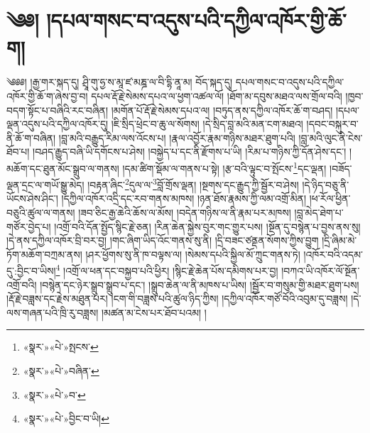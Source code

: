 \chapter{༄༅། །དཔལ་གསང་བ་འདུས་པའི་དཀྱིལ་འཁོར་གྱི་ཆོ་ག།}༄༅༅། །རྒྱ་གར་སྐད་དུ། ཤྲཱི་གུ་ཧྱ་ས་མཱ་ཛ་མཎྜ་ལ་བི་དྷི་ནཱ་མ། བོད་སྐད་དུ། དཔལ་གསང་བ་འདུས་པའི་དཀྱིལ་འཁོར་གྱི་ཆོ་ག་ཞེས་བྱ་བ། དཔལ་རྡོ་རྗེ་སེམས་དཔའ་ལ་ཕྱག་འཚལ་ལོ། །ཐོག་མ་དབུས་མཐའ་ལས་གྲོལ་བའི། །ཁྱབ་བདག་སྟོང་པ་བཞིའི་རང་བཞིན། །མགོན་པོ་རྡོ་རྗེ་སེམས་དཔའ་ལ། །བཏུད་ནས་དཀྱིལ་འཁོར་ཆོ་ག་བཤད། །དཔལ་ལྡན་འདུས་པའི་དཀྱིལ་འཁོར་དུ། །ཇི་སྲིད་ཕྲེང་བ་ཆུ་ལ་སོགས། །དེ་སྲིད་བླ་མའི་མན་ངག་མཐའ། །དབང་བསྐུར་བ་ནི་ཆོ་ག་བཞིན། །བླ་མའི་བརྒྱུད་རིམ་ལས་འོངས་པ། །རྣལ་འབྱོར་རྣམ་གཉིས་མཐར་ཐུག་པའི། །བླ་མའི་ལུང་ནི་ངེས་ཐོབ་པ། །བཤད་རྒྱུད་བཞི་ཡི་དགོངས་པ་ཤེས། །བསྐྱེད་པ་དང་ནི་རྫོགས་པ་ཡི། །རིམ་པ་གཉིས་ཀྱི་དོན་ཤེས་དང་། །མཆོག་དང་ཐུན་མོང་སྒྲུབ་ལ་གནས། །དམ་ཚིག་སྡོམ་ལ་གནས་པ་སྟེ། །རྩ་བའི་ལྟུང་བ་སྤོངས་\footnote{«སྣར་»«པེ་»སྤངས་}དང་ལྡན། །བཟོད་ལྡན་དྲང་ལ་གཡོ་སྒྱུ་མེད། །བརྟན་ཞིང་\footnote{«སྣར་»«པེ་»བཞིན་}དུལ་ལ་\footnote{«སྣར་»«པེ་»བ་}བློ་གྲོས་ལྡན། །སྔགས་དང་རྒྱུད་ཀྱི་སྦྱོར་བ་ཤེས། །དེ་ཉིད་བཅུ་ནི་ཡོངས་ཤེས་ཤིང་། །དཀྱིལ་འཁོར་འདྲི་དང་རབ་གནས་མཁས། །ཉན་ཐོས་རྣམས་ཀྱི་ལམ་འགྲོ་མིན། །ཕ་རོལ་ཕྱིན་བཅུའི་ཚུལ་ལ་གནས། །ཟབ་ཅིང་རྒྱ་ཆེའི་ཆོས་ལ་མོས། །བདེན་གཉིས་ལ་ནི་རྣམ་པར་མཁས། །བླ་མེད་ཐེག་པ་གཙོར་བྱེད་པ། །འགྲོ་བའི་དོན་སྤྱོད་སྙིང་རྗེ་ཅན། །རིན་ཆེན་སྐྱེས་བུར་གང་གྱུར་པས། །སྔོན་དུ་བསྙེན་པ་བྱས་ནས་སུ། །དེ་ནས་དཀྱིལ་འཁོར་བྲི་བར་བྱ། །གང་ཞིག་ཡིད་འོང་གནས་སུ་ནི། །དྲི་བཟང་ཙནྡན་སོགས་ཀྱིས་བྱུག །དྲི་ཞིམ་མེ་ཏོག་མཆོག་བཀྲམ་ནས། །ཤར་ཕྱོགས་སུ་ནི་ཁ་བལྟས་ལ། །སེམས་དཔའི་སྐྱིལ་མོ་ཀྲུང་གནས་ཏེ། །འཁོར་བའི་འདམ་དུ་:བྱིང་བ་ཡིས།\footnote{«སྣར་»«པེ་»བྱིང་བ་ཡི།} །འགྲོ་ལ་ཕན་དང་བསྐྱབ་པའི་ཕྱིར། །སྙིང་རྗེ་ཆེན་པོས་དམིགས་པར་བྱ། །བཀའ་ཡི་འཁོར་ལོ་སྔོན་འགྲོ་བའི། །བསྙེན་དང་ཉེར་སྒྲུབ་སྒྲུབ་པ་དང་། །སྒྲུབ་ཆེན་ལ་ནི་མཁས་པ་ཡིས། །སྦྱོར་བ་གསུམ་གྱི་མཐར་ཐུག་པས། །རྡོ་རྗེ་བཟླས་དང་རྗེས་མཐུན་པར། །ངག་གི་བཟླས་པའི་ཚུལ་ཉིད་ཀྱིས། །དཀྱིལ་འཁོར་གཙོ་བོའི་འབུམ་དུ་བཟླས། །དེ་ལས་གཞན་པའི་ཁྲི་རུ་བཟླས། །མཚན་མ་ངེས་པར་ཐོབ་པའམ། །
